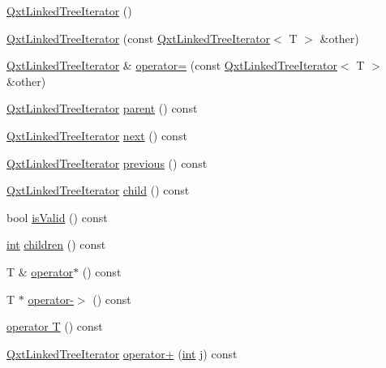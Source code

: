 \begin{DoxyCompactItemize}
\item 
\hyperlink{class_qxt_linked_tree_iterator_a6c56c65efa16b3034c2107b005340d30}{Qxt\-Linked\-Tree\-Iterator} ()
\item 
\hyperlink{class_qxt_linked_tree_iterator_aebf51309b56f68210a5879b9fae98702}{Qxt\-Linked\-Tree\-Iterator} (const \hyperlink{class_qxt_linked_tree_iterator}{Qxt\-Linked\-Tree\-Iterator}$<$ T $>$ \&other)
\item 
\hyperlink{class_qxt_linked_tree_iterator}{Qxt\-Linked\-Tree\-Iterator} \& \hyperlink{class_qxt_linked_tree_iterator_a72352f38f0693f5643150bbf8f5f4b60}{operator=} (const \hyperlink{class_qxt_linked_tree_iterator}{Qxt\-Linked\-Tree\-Iterator}$<$ T $>$ \&other)
\item 
\hyperlink{class_qxt_linked_tree_iterator}{Qxt\-Linked\-Tree\-Iterator} \hyperlink{class_qxt_linked_tree_iterator_ada79b2424c062d5a0928566e82650d3b}{parent} () const 
\item 
\hyperlink{class_qxt_linked_tree_iterator}{Qxt\-Linked\-Tree\-Iterator} \hyperlink{class_qxt_linked_tree_iterator_a860eaaa7ac71bae9f8d4b4c97e48014c}{next} () const 
\item 
\hyperlink{class_qxt_linked_tree_iterator}{Qxt\-Linked\-Tree\-Iterator} \hyperlink{class_qxt_linked_tree_iterator_a147d18143015fa3389c1b1e4144f38e0}{previous} () const 
\item 
\hyperlink{class_qxt_linked_tree_iterator}{Qxt\-Linked\-Tree\-Iterator} \hyperlink{class_qxt_linked_tree_iterator_affa0700ff1b86d2db1edf8fa74514022}{child} () const 
\item 
bool \hyperlink{class_qxt_linked_tree_iterator_a831357ab68239391e31650f1725a7fc6}{is\-Valid} () const 
\item 
\hyperlink{ioapi_8h_a787fa3cf048117ba7123753c1e74fcd6}{int} \hyperlink{class_qxt_linked_tree_iterator_a27f72ca408bb5b78e285be5a52cd8385}{children} () const 
\item 
T \& \hyperlink{class_qxt_linked_tree_iterator_a38db2c6b4219a4c336dd1d3d11efd94f}{operator$\ast$} () const 
\item 
T $\ast$ \hyperlink{class_qxt_linked_tree_iterator_aaa0ccbe2220c72feda5531fc44f06c6f}{operator-\/$>$} () const 
\item 
\hyperlink{class_qxt_linked_tree_iterator_ad5ec4622e356f6d9157b324379e75eda}{operator T} () const 
\item 
\hyperlink{class_qxt_linked_tree_iterator}{Qxt\-Linked\-Tree\-Iterator} \hyperlink{class_qxt_linked_tree_iterator_a201c56c712812566ffca2b37cc66c671}{operator+} (\hyperlink{ioapi_8h_a787fa3cf048117ba7123753c1e74fcd6}{int} j) const 

\end{DoxyCompactItemize}
